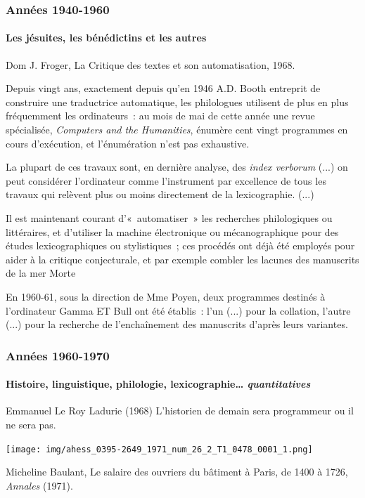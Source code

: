 \documentclass[ignorenonframetext]{beamer}
\begin{document}
\begin{frame}[shrink]
\frametitle{Années 1940-1960}
\framesubtitle{Les jésuites, les bénédictins et les autres}

\begin{block}{Dom J. Froger, La Critique des textes et son automatisation, 1968.}
	
	Depuis vingt ans, exactement depuis qu'en 1946 A.D. Booth entreprit de construire une traductrice automatique, les philologues utilisent de plus en plus fréquemment les ordinateurs : au mois de mai de cette année une revue spécialisée, \textit{Computers and the Humanities}, énumère cent vingt programmes en cours d'exécution, et l'énumération n'est pas exhaustive.
	
	La plupart de ces travaux sont, en dernière analyse, des \textit{index verborum} (...) on peut considérer l'ordinateur comme l'instrument par excellence de tous les travaux qui relèvent plus ou moins directement de la lexicographie. (...)
	
	Il est maintenant \alert{courant d'« automatiser » les recherches philologiques ou littéraires, et d'utiliser la machine électronique ou mécanographique pour des études lexicographiques ou stylistiques ; ces procédés ont déjà été employés pour aider à la critique conjecturale, et par exemple combler les lacunes des manuscrits de la mer Morte}
	
	En 1960-61, sous la direction de Mme Poyen, deux \og{}programmes\fg{} destinés à l'ordinateur Gamma ET Bull ont été établis : l'un (...) pour la collation, l'autre (...) pour la recherche de l'enchaînement des manuscrits d'après leurs variantes.
\end{block}


\end{frame}


% 

\begin{frame}
\frametitle{Années 1960-1970}
\framesubtitle{Histoire, linguistique, philologie, lexicographie… \emph{quantitatives}}


\begin{block}{Emmanuel Le Roy Ladurie (1968)}
	L'historien de demain sera programmeur ou il ne sera pas.
\end{block}


\texttt{[image: img/ahess\_0395-2649\_1971\_num\_26\_2\_T1\_0478\_0001\_1.png]}

{\footnotesize %
Micheline Baulant, \og{}Le salaire des ouvriers du bâtiment à Paris, de 1400 à 1726\fg{}, \textit{Annales} (1971).
}

\end{frame}
\end{document}
